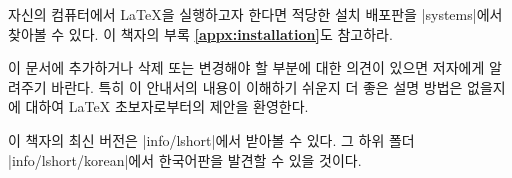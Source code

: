 자신의 컴퓨터에서 \LaTeX 을 실행하고자 한다면 적당한 설치 배포판을 \CTAN|systems|에서 찾아볼 수 있다. 이 책자의 부록 \textbf{\ref{appx:installation}}도 참고하라.

\noindent 이 문서에 추가하거나 삭제 또는 변경해야 할 부분에 대한 의견이 있으면 저자에게 알려주기 바란다. 특히 이 안내서의 내용이 이해하기 쉬운지 더 좋은 설명 방법은 없을지에 대하여 \LaTeX{} 초보자로부터의 제안을 환영한다.

\bigskip
\begin{verse}
%
\end{verse}

\noindent 이 책자의 최신 버전은 \CTAN|info/lshort|에서 받아볼 수 있다.
그 하위 폴더 \CTAN|info/lshort/korean|에서 한국어판을 발견할 수 있을 것이다.





